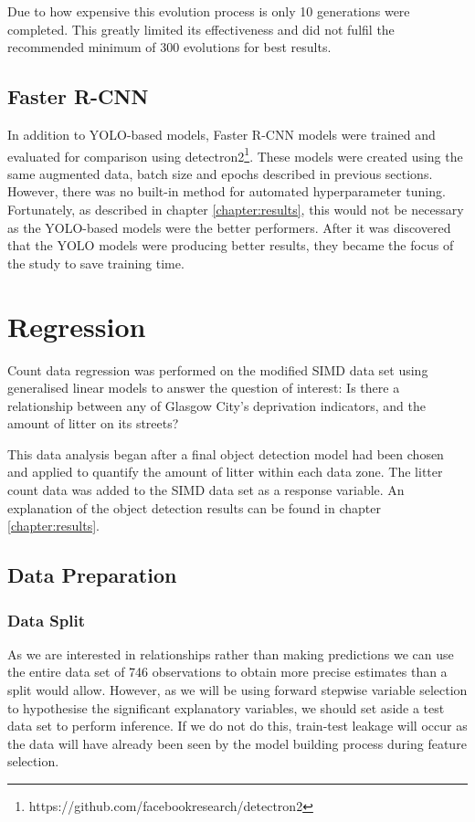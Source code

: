 \documentclass{thesis}
\begin{document}
Due to how expensive this evolution process is only 10 generations were completed. This greatly limited its effectiveness and did not fulfil the recommended minimum of 300 evolutions for best results\cite{yolov5-hyperparam}.

\subsection{Faster R-CNN}

In addition to YOLO-based models, Faster R-CNN models were trained and evaluated for comparison using detectron2\footnote{https://github.com/facebookresearch/detectron2}. These models were created using the same augmented data, batch size and epochs described in previous sections. However, there was no built-in method for automated hyperparameter tuning. Fortunately, as described in chapter \ref{chapter:results}, this would not be necessary as the YOLO-based models were the better performers. After it was discovered that the YOLO models were producing better results, they became the focus of the study to save training time.

\section{Regression}

Count data regression was performed on the modified SIMD data set using generalised linear models to answer the question of interest: Is there a relationship between any of Glasgow City's deprivation indicators, and the amount of litter on its streets?

This data analysis began after a final object detection model had been chosen and applied to quantify the amount of litter within each data zone. The litter count data was added to the SIMD data set as a response variable. An explanation of the object detection results can be found in chapter \ref{chapter:results}. 

\subsection{Data Preparation}

\subsubsection{Data Split}

As we are interested in relationships rather than making predictions we can use the entire data set of 746 observations to obtain more precise estimates than a split would allow. However, as we will be using forward stepwise variable selection to hypothesise the significant explanatory variables, we should set aside a test data set to perform inference. If we do not do this, train-test leakage will occur as the data will have already been seen by the model building process during feature selection.
\end{document}
